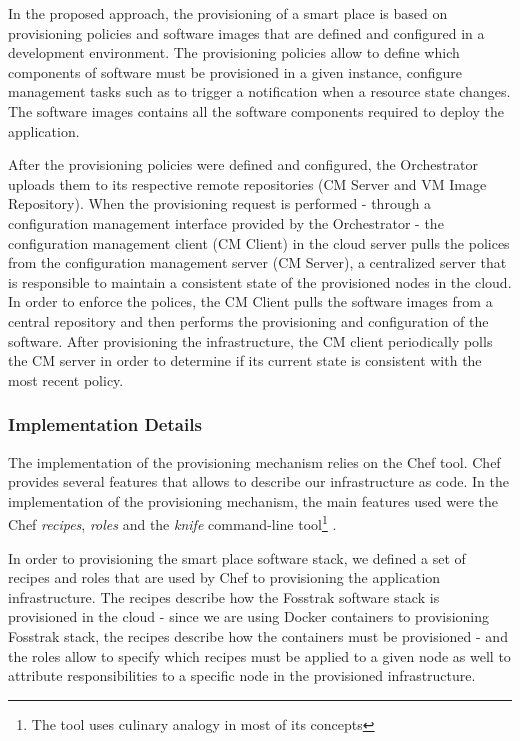 In the proposed approach, the provisioning of a smart place is based on provisioning policies and
software images that are defined and configured in a development environment. The provisioning policies
allow to define which components of software must be provisioned in a given instance, configure
management tasks such as to trigger a notification when a resource state changes. The software images
contains all the software components required to deploy the application.

After the provisioning policies were defined and configured, the Orchestrator uploads them to its respective
remote repositories (CM Server and VM Image Repository). When the provisioning request is performed -
through a configuration management interface provided by the Orchestrator - the configuration management
client (\gls{CM} Client) in the cloud server pulls the polices from the configuration management server
(\gls{CM} Server), a centralized server that is responsible to maintain a consistent state of the
provisioned nodes in the cloud. In order to enforce the polices, the \gls{CM} Client pulls the software
images from a central repository and then performs the provisioning and configuration of the software.
After provisioning the infrastructure, the CM client periodically polls the CM server in order to
determine if its current state is consistent with the most recent policy.

\subsubsection{Implementation Details}
\label{subs:impl_provisioning}
The implementation of the provisioning mechanism relies on the Chef tool. Chef provides several
features that allows to describe our infrastructure as code. In the implementation of the provisioning
mechanism, the main features used were the Chef \textit{recipes}, \textit{roles} and the \textit{knife}
command-line tool\footnote{The tool uses culinary analogy in most of its concepts} .

In order to provisioning the smart place software stack, we defined a set of recipes and roles that
are used by Chef to provisioning the application infrastructure. The recipes describe how the
Fosstrak software stack is provisioned in the cloud - since we are using Docker containers to
provisioning Fosstrak stack, the recipes describe how the containers must be provisioned -
and the roles allow to specify which recipes must be applied to a given node as well to
attribute responsibilities to a specific node in the provisioned infrastructure.

